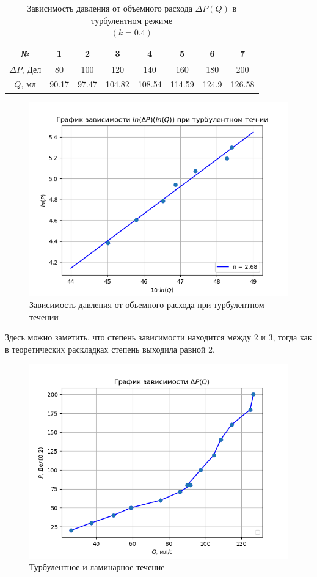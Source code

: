 \begin{table}[h!]
    \centering
    \begin{tabular}{|c|c|c|c|c|c|c|c|}
        \hline
        №  & 1 & 2 & 3 & 4 & 5 & 6 & 7\\\hline 
        $\Delta P$, Дел & 80 & 100 & 120 & 140 & 160 & 180 & 200\\\hline 
        $Q$, мл & 90.17 & 97.47 & 104.82 & 108.54 & 114.59 & 124.9 & 126.58\\\hline 
    \end{tabular}
    \caption{Зависимость давления от объемного расхода $\Delta P(Q)$ 
    в турбулентном режиме\\ $(k = 0.4)$}
\end{table}

\begin{figure}[h!]
    \centering
    \includegraphics[width=12cm]{plot2.png}
    \caption{Зависимость давления от объемного расхода 
    при турбулентном течении}
    \label{fig:plot2}
\end{figure}
Здесь можно заметить, что степень зависимости находится между 2 и 3, тогда как в 
теоретических раскладках степень выходила равной 2. 

\begin{figure}[h!]
    \centering
    \includegraphics[width=12cm]{plotall1.png}
    \caption{Турбулентное и ламинарное течение}
    \label{fig:plotall1}
\end{figure}


